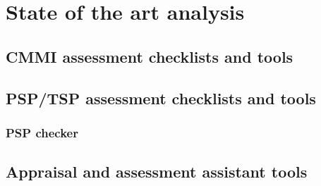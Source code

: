 \chapter{State of the art analysis}\label{chap:chap3}

\section{CMMI assessment checklists and tools}

\section{PSP/TSP assessment checklists and tools}
\subsection{PSP checker}

\section{Appraisal and assessment assistant tools}